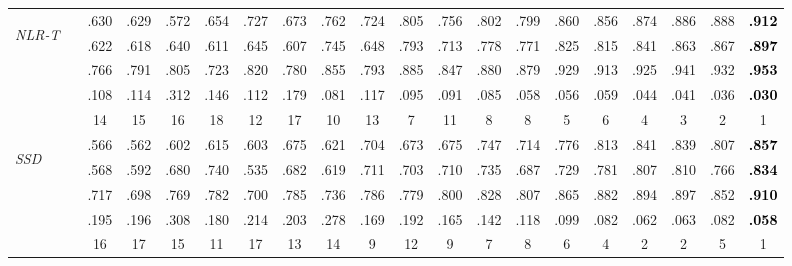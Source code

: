 \documentclass[journal]{IEEEtran}
\newcommand{\trb}[1]{\textbf{\textcolor{black}{#1}}}
\begin{document}
\begin{table*}[t!]
\begin{tabular}{lr||c|c|c|c|c|c|c|c|c|c|c||c|c|c|c|c|c|c}
\midrule
  \multirow{4}{*}{\begin{sideways}\textit{NLR-T}\cite{peng2014rgbd}\end{sideways}}
    &     & .630 & .629 & .572 & .654  & .727 & .673 & .762& .724 & .805  & .756 & .802 & .799 & .860 & .856  & .874  & .886 & .888 & \trb{.912}\\
&      & .622 & .618 & .640 & .611  & .645 & .607 & .745& .648 & .793 & .713 & .778 & .771 & .825 & .815  & .841  & .863 & .867 & \trb{.897}      \\
&        & .766 & .791 & .805 & .723  & .820 & .780 & .855& .793 & .885   & .847 & .880 & .879 & .929 & .913  & .925  & .941 & .932 & \trb{.953}      \\
&  & .108 & .114 & .312 & .146  & .112 & .179 & .081& .117 & .095 & .091 & .085 & .058 & .056 & .059  & .044  & .041 & .036 & \trb{.030}\\
\toprule
    &   & 14 & 15 & 16 & 18 & 12 & 17 & 10 & 13 & 7 & 11 & 8 & 8 & 5 & 6 & 4 & 3 & 2 & 1  \\
    \midrule

\multirow{4}{*}{\begin{sideways}\textit{SSD}\cite{zhu2017three}\end{sideways}}
    &     & .566 & .562 & .602 & .615  & .603 & .675 & .621& .704 & .673  & .675 & .747 & .714 & .776 & .813  & .841   & .839 & .807 & \trb{.857}\\
&      & .568 & .592 & .680 & .740  & .535 & .682 & .619 & .711& .703   & .710 & .735 & .687 & .729 & .781  & .807   & .810 & .766 & \trb{.834}      \\
&        & .717 & .698 & .769 & .782  & .700 & .785 & .736 & .786& .779  & .800 & .828 & .807 & .865 & .882  & .894   & .897 & .852 & \trb{.910}\\
&  & .195 & .196 & .308 & .180  & .214 & .203 & .278& .169 & .192  & .165 & .142 & .118 & .099 & .082  & .062   & .063 & .082 & \trb{.058}      \\
\toprule
    &    & 16 & 17 & 15 & 11 & 17 & 13 & 14 & 9 & 12 & 9 & 7 & 8 & 6 & 4 & 2 & 2 & 5 & 1 \\


\end{tabular}
\end{table*}
\end{document}
